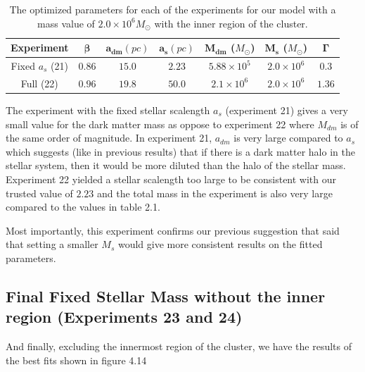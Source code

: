 \begin{table}[H]
\centering
\begin{tabular}{| c| c| c| c| c| c| c|}
    \hline
    \textbf{Experiment} & $\mathbf{\beta}$ & $\mathbf{a_{dm}} (pc)$ & $\mathbf{a_{s}} (pc)$ & $\mathbf{M_{dm}}$ ($M_{\odot}$) & $\mathbf{M_{s}}$ ($M_{\odot}$) & $\mathbf{\Gamma}$\\ \hline
	Fixed $a_s$ (21) &	$0.86$ &	$15.0$ &	$\mathbf{2.23}$ &	$5.88 \times 10^{5}$ &	$2.0 \times 10 ^{6}$ &	$0.3$\\ \hline
	Full (22) &	$0.96$ &	$19.8$ &	$50.0$ &	$2.1 \times 10^{6}$ &	$2.0 \times 10^{6}$ &	$1.36$\\ \hline
  \end{tabular} 
\caption[Optimized parameters for our model with a mass value based on the Starlight procedures with the inner region.]{The optimized parameters for each of the experiments for our model with a mass value of $2.0 \times 10^{6} M_{\odot}$ with the inner region of the cluster.}
\end{table}

The experiment with the fixed stellar scalength $a_s$ (experiment 21) gives a very small value for the dark matter mass as oppose to experiment 22 where $M_{dm}$ is of the same order of magnitude. In experiment 21, $a_{dm}$ is very large compared to $a_s$ which suggests (like in previous results) that if there is a dark matter halo in the stellar system, then it would be more diluted than the halo of the stellar mass. Experiment 22 yielded a stellar scalength too large to be consistent with our trusted value of $2.23$ and the total mass in the experiment is also very large compared to the values in table 2.1. 

Most importantly, this experiment confirms our previous suggestion that said that setting a smaller $M_s$ would give more consistent results on the fitted parameters.

\subsection{Final Fixed Stellar Mass without the inner region (Experiments 23 and 24)}

And finally, excluding the innermost region of the cluster, we have the results of the best fits shown in figure 4.14

